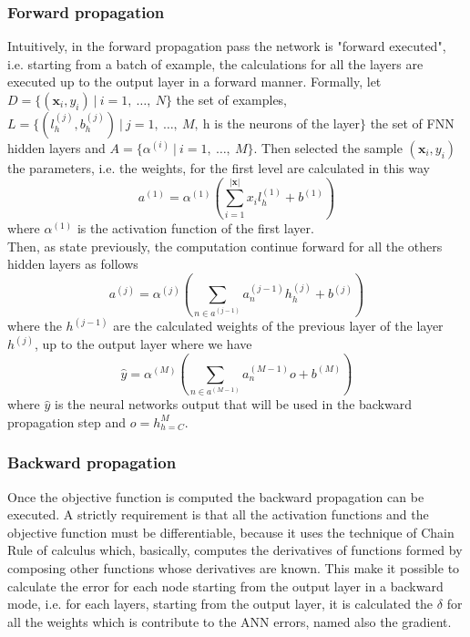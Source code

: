 \subsubsection{Forward propagation}
Intuitively, in the forward propagation pass the network is "forward executed", i.e. starting from a batch of example, the calculations for all the layers are executed up to the output layer in a forward manner. Formally, let $D = \{(\textbf{x}_{i}, y_{i})\ |\ i=1,\ \dots ,\ N \}$ the set of examples, $L = \{(l^{(j)}_{h}, b^{(j)}_{h})\ |\ j = 1,\ \dots,\ M,\ $h is the neurons of the layer$\}$ the set of FNN hidden layers and $A = \{\alpha^{(i)}\ |\ i = 1,\ \dots,\ M\}$. Then selected the sample $(\textbf{x}_i, y_i)$ the parameters, i.e. the weights, for the first level are calculated in this way
\begin{equation}
	a^{(1)} = \alpha^{(1)}(\sum\limits_{i=1}^{|\textbf{x}|}x_{i}l_{h}^{(1)} + b^{(1)})
\end{equation}
where $\alpha^{(1)}$ is the activation function of the first layer.\\
Then, as state previously, the computation continue forward for all the others hidden layers as follows
\begin{equation}
	a^{(j)} = \alpha^{(j)}(\sum\limits_{n \in a^{(j - 1)}}a^{(j - 1)}_{n}h^{(j)}_{h} + b^{(j)})
\end{equation}
where the $h^{(j - 1)}$ are the calculated weights of the previous layer of the layer $h^{(j)}$, up to the output layer where we have
\begin{equation}
	\hat{y} = \alpha^{(M)}(\sum\limits_{n \in a^{(M - 1)}}a^{(M - 1)}_{n}o + b^{(M)})	
\end{equation}
where $\hat{y}$ is the neural networks output that will be used in the backward propagation step and $o = h^{M}_{h = C}$.

\subsubsection{Backward propagation}
Once the objective function is computed the backward propagation can be executed. A strictly requirement is that all the activation functions and the objective function must be differentiable, because it uses the technique of Chain Rule of calculus which, basically, computes the derivatives of functions formed by composing other functions whose derivatives are known.
This make it possible to calculate the error for each node starting from the output layer in a backward mode, i.e. for each layers, starting from the output layer, it is calculated the $\delta$ for all the weights which is contribute to the ANN errors, named also the gradient.

